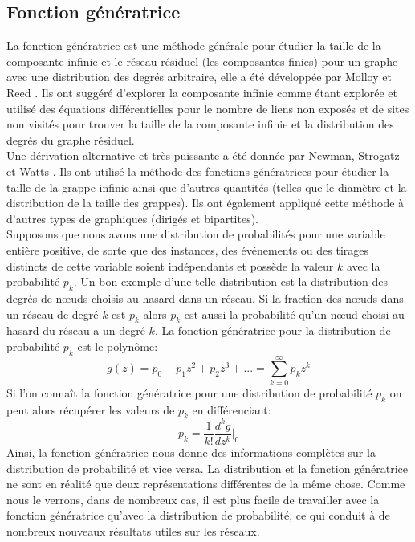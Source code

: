 \subsection{Fonction génératrice}
La fonction génératrice est une méthode générale pour étudier la taille de la composante infinie et le réseau résiduel (les composantes finies) pour un graphe avec une distribution des degrés arbitraire, elle a été développée par Molloy et Reed \cite{Molloy-Reed1998}. Ils ont suggéré d'explorer la composante infinie comme étant explorée et utilisé des équations différentielles pour le nombre de liens non exposés et de sites non visités pour trouver la taille de la composante infinie et la distribution des degrés du graphe résiduel.\\
Une dérivation alternative et très puissante a été donnée par Newman, Strogatz et Watts \cite{Newman-al2001}. Ils ont utilisé la méthode des fonctions génératrices pour étudier la taille de la grappe infinie ainsi que d'autres quantités (telles que le diamètre et la distribution de la taille des grappes). Ils ont également appliqué cette méthode à d'autres types de graphiques (dirigés et bipartites).\\
Supposons que nous avons une distribution de  probabilités pour une variable entière positive, de sorte que des instances, des événements ou des tirages distincts de cette variable soient indépendants et possède la valeur $k$ avec la probabilité $p_k$. Un bon exemple d'une telle distribution est la distribution des degrés de nœuds choisis au hasard dans un réseau. Si la fraction des nœuds dans un réseau de degré $k$ est $p_k$ alors $p_k$ est aussi la probabilité qu'un nœud choisi au hasard du réseau a un degré $k$. La fonction génératrice pour la distribution de probabilité $p_k$ est le polynôme:
\begin{equation}
g(z)=p_0+p_1z^2+p_2z^3+...=\sum_{k=0}^{\infty}p_kz^k
\end{equation}
Si l'on connaît la fonction génératrice pour une distribution de probabilité $p_k$ on peut alors récupérer les valeurs de $p_k$ en différenciant:
\begin{equation}
p_k=\frac{1}{k!}\frac{d^kg}{dz^k}\Big\lvert_0
\end{equation}
Ainsi, la fonction génératrice nous donne des informations complètes sur la distribution de probabilité et vice versa. La distribution et la fonction génératrice ne sont en réalité que deux représentations différentes de la même chose. Comme nous le verrons, dans de nombreux cas, il est plus facile de travailler avec la fonction génératrice qu'avec la distribution de probabilité, ce qui conduit à de nombreux nouveaux résultats utiles sur les réseaux.\\

